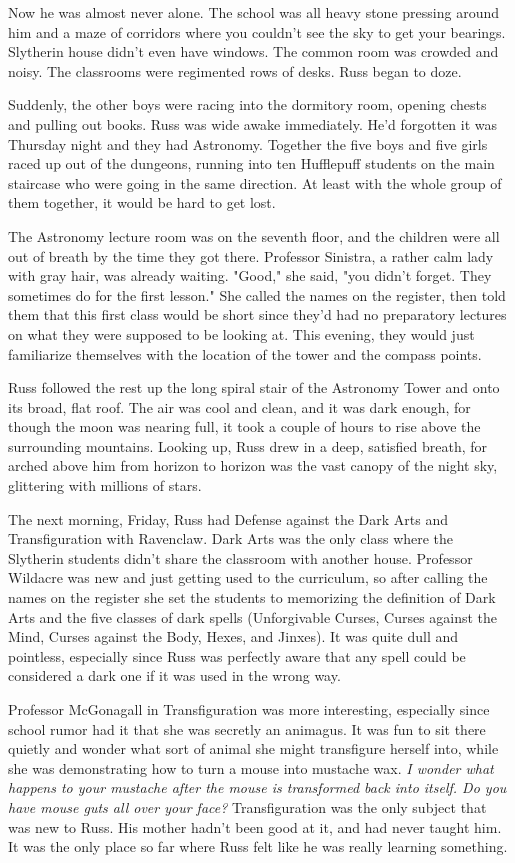 \documentclass[a4paper,11pt]{article}
\begin{document}
Now he was almost never alone. The school was all heavy stone pressing around him and a maze of corridors where you couldn't see the sky to get your bearings. Slytherin house didn't even have windows. The common room was crowded and noisy. The classrooms were regimented rows of desks. Russ began to doze.

Suddenly, the other boys were racing into the dormitory room, opening chests and pulling out books. Russ was wide awake immediately. He'd forgotten it was Thursday night and they had Astronomy. Together the five boys and five girls raced up out of the dungeons, running into ten Hufflepuff students on the main staircase who were going in the same direction. At least with the whole group of them together, it would be hard to get lost.

The Astronomy lecture room was on the seventh floor, and the children were all out of breath by the time they got there. Professor Sinistra, a rather calm lady with gray hair, was already waiting. "Good," she said, "you didn't forget. They sometimes do for the first lesson." She called the names on the register, then told them that this first class would be short since they'd had no preparatory lectures on what they were supposed to be looking at. This evening, they would just familiarize themselves with the location of the tower and the compass points.

Russ followed the rest up the long spiral stair of the Astronomy Tower and onto its broad, flat roof. The air was cool and clean, and it was dark enough, for though the moon was nearing full, it took a couple of hours to rise above the surrounding mountains. Looking up, Russ drew in a deep, satisfied breath, for arched above him from horizon to horizon was the vast canopy of the night sky, glittering with millions of stars.

The next morning, Friday, Russ had Defense against the Dark Arts and Transfiguration with Ravenclaw. Dark Arts was the only class where the Slytherin students didn't share the classroom with another house. Professor Wildacre was new and just getting used to the curriculum, so after calling the names on the register she set the students to memorizing the definition of Dark Arts and the five classes of dark spells (Unforgivable Curses, Curses against the Mind, Curses against the Body, Hexes, and Jinxes). It was quite dull and pointless, especially since Russ was perfectly aware that any spell could be considered a dark one if it was used in the wrong way.

Professor McGonagall in Transfiguration was more interesting, especially since school rumor had it that she was secretly an animagus. It was fun to sit there quietly and wonder what sort of animal she might transfigure herself into, while she was demonstrating how to turn a mouse into mustache wax. \emph{I wonder what happens to your mustache after the mouse is transformed back into itself. Do you have mouse guts all over your face?} Transfiguration was the only subject that was new to Russ. His mother hadn't been good at it, and had never taught him. It was the only place so far where Russ felt like he was really learning something.
\end{document}
